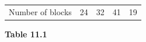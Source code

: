 \begin{enumerate}[noitemsep, label=\textbf{\arabic*}. ]
{{\begin{center}
\begin{tabular}[t]{|l|l|l|l|l|}
    
        Number of
blocks &
    
    
        24 &
    
    
        32 &
    
    
        41 &
    
    
        19%
     \tabularnewline\cline{1-1}\cline{2-2}\cline{3-3}\cline{4-4}\cline{5-5}
    \end{tabular}
      \end{center}
    \begin{center}{\small\bfseries Table 11.1}\end{center}
    
    \addtocounter{footnote}{-0}
    
          }{ %
        
    
        \begin{center}
      
      \label{m39377*id114946}
      
    \noindent
      \tablelasttail{}
      \begin{xtabular}[t]{|l|l|l|l|l|}\hline
    

\end{xtabular}
\end{center}}}
\end{enumerate}
